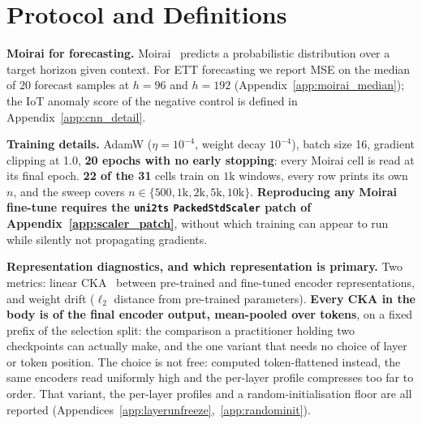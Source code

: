 \section{Protocol and Definitions}
\label{sec:method}

\textbf{Moirai for forecasting.}
Moirai~\cite{woo2024moirai} predicts a probabilistic distribution
over a target horizon given context.  For ETT forecasting we report
MSE on the median of 20 forecast samples at $h{=}96$ and $h{=}192$
(Appendix~\ref{app:moirai_median}); the IoT anomaly score of the
negative control is defined in Appendix~\ref{app:cnn_detail}.

\textbf{Training details.}
AdamW ($\eta{=}10^{-4}$, weight decay $10^{-4}$), batch size 16, gradient clipping
at 1.0, \textbf{20 epochs with no early stopping}: every Moirai cell is read at its
final epoch.  \textbf{22 of the 31} cells train on $1{\text{k}}$ windows, every row
prints its own $n$, and the sweep covers
$n{\in}\{500,1{\text{k}},2{\text{k}},5{\text{k}},10{\text{k}}\}$.
\textbf{Reproducing any Moirai fine-tune requires the \texttt{uni2ts}
\texttt{PackedStdScaler} patch of Appendix~\ref{app:scaler_patch}}, without which
training can appear to run while silently not propagating gradients.

\textbf{Representation diagnostics, and which representation is primary.}  Two
metrics: linear CKA~\cite{kornblith2019cka} between pre-trained and fine-tuned
encoder representations, and weight drift ($\ell_2$ distance from pre-trained
parameters).  \textbf{Every CKA in the body is of the final encoder output,
mean-pooled over tokens}, on a fixed prefix of the selection split: the
comparison a practitioner holding two checkpoints can actually make, and the one
variant that needs no choice of layer or token position.  The choice is not free:
computed token-flattened instead, the same encoders read uniformly high and the
per-layer profile compresses too far to order.  That variant, the per-layer
profiles and a random-initialisation floor are all reported
(Appendices~\ref{app:layerunfreeze},~\ref{app:randominit}).

